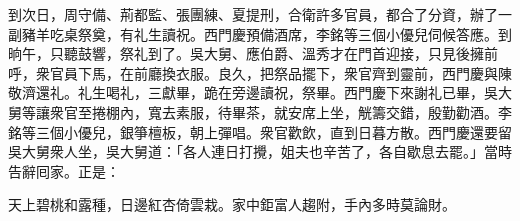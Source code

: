 到次日，周守備、荊都監、張團練、夏提刑，合衛許多官員，都合了分資，辦了一副豬羊吃桌祭奠，有礼生讀祝。西門慶預備酒席，李銘等三個小優兒伺候答應。到晌午，只聽鼓響，祭礼到了。吳大舅、應伯爵、溫秀才在門首迎接，只見後擁前呼，衆官員下馬，在前廳換衣服。良久，把祭品擺下，衆官齊到靈前，西門慶與陳敬濟還礼。礼生喝礼，三獻畢，跪在旁邊讀祝，祭畢。西門慶下來謝礼已畢，吳大舅等讓衆官至捲棚內，寬去素服，待畢茶，就安席上坐，觥籌交錯，殷勤勸酒。李銘等三個小優兒，銀箏檀板，朝上彈唱。衆官歡飲，直到日暮方散。西門慶還要留吳大舅衆人坐，吳大舅道：「各人連日打攪，姐夫也辛苦了，各自歇息去罷。」當時告辭囘家。正是：

天上碧桃和露種，日邊紅杏倚雲栽。家中鉅富人趨附，手內多時莫論財。

